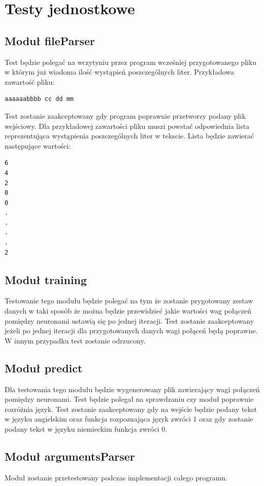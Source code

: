 \documentclass[8pt]{article}
\begin{document}
\section{Testy jednostkowe}
\subsection{Moduł fileParser}
\hspace*{1 cm} Test będzie polegać na wczytyniu przez program wcześniej przygotowanego pliku w którym już wiadoma ilość wystąpień poszczególnych liter. Przykładowa zawartość pliku: \newpage
\begin{verbatim}
aaaaaabbbb cc dd mm
\end{verbatim}
\hspace*{1 cm} Test zostanie zaakceptowany gdy program poprawnie przetworzy podany plik wejściowy. Dla przykładowej zawartości pliku muszi powstać odpowiednia lista reprezentująca wystąpienia poszczególnych liter w tekscie. Lista będzie zawierać następujące wartości: 
\begin{verbatim}
6
4
2
0
0
.
.
.
.
2
\end{verbatim}
\subsection{Moduł training}
\hspace*{1 cm} Testowanie tego modułu będzie polegać na tym że zostanie prygotowany zestaw danych w taki sposób że można będzie przewidzieć jakie wartości wag połączeń pomiędzy neuronami ustawią się po jednej iteracji. \newline
\hspace*{1 cm}Test zostanie zaakceptowany jeżeli po jednej iteracji dla przygotowanych danych wagi połąceń będą poprawne. W innym przypadku test zostanie odrzucony. 
\subsection{Moduł predict}
\hspace*{1 cm} Dla testowania tego modułu będzie wygenerowany plik zawierający wagi połączeń pomiędzy neuronami. Test będzie polegał na sprawdzaniu czy moduł  poprawnie rozróżnia język.\newline
\hspace*{1 cm} Test zostanie zaakceptowany gdy na wejście będzie podany tekst w języku angielskim oraz funkcja rozpoznająca język zwróci 1 oraz gdy zostanie podany tekst w języku niemieckim funkcja zwróci 0.
\subsection{Moduł argumentsParser}
\hspace*{1 cm} Moduł zostanie przetestowany podczas implementacji całego programu.
\end{document}

